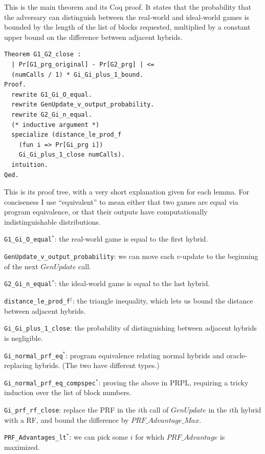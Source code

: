 \documentclass[12pt,lot, lof]{puthesis}
\newcommand{\li} {\lstinline}
\begin{document}
{This is the main theorem and its Coq proof. It states that the probability that the adversary can distinguish between the real-world and ideal-world games is bounded by the length of the list of blocks requested, multiplied by a constant upper bound on the difference between adjacent hybrids.

\begin{lstlisting}
Theorem G1_G2_close :
  | Pr[G1_prg_original] - Pr[G2_prg] | <= 
  (numCalls / 1) * Gi_Gi_plus_1_bound.
Proof.
  rewrite G1_Gi_O_equal.
  rewrite GenUpdate_v_output_probability.
  rewrite G2_Gi_n_equal.
  (* inductive argument *)
  specialize (distance_le_prod_f 
  	(fun i => Pr[Gi_prg i]) 
	Gi_Gi_plus_1_close numCalls).
  intuition.
Qed.
\end{lstlisting}

This is its proof tree, with a very short explanation given for each lemma. For conciseness I use ``equivalent'' to mean either that two games are equal via program equivalence, or that their outputs have computationally indistinguishable distributions. 

\begin{longenum}
\item \li|G1_Gi_O_equal|$^*$: the real-world game is equal to the first hybrid.
\item \li|GenUpdate_v_output_probability|: we can move each $v$-update to the beginning of the next $GenUpdate$ call.
\item \li|G2_Gi_n_equal|$^*$: the ideal-world game is equal to the last hybrid.
\item \li|distance_le_prod_f|$^\dag$: the triangle inequality, which lets us bound the distance between adjacent hybrids.
\item \li|Gi_Gi_plus_1_close|: the probability of distinguishing between adjacent hybrids is negligible.
  \begin{longenum}
  \item \li|Gi_normal_prf_eq|$^*$: program equivalence relating normal hybrids and oracle-replacing hybrids. (The two have different types.)
    \begin{longenum}
    \item \li|Gi_normal_prf_eq_compspec|$^*$: proving the above in PRPL, requiring a tricky induction over the list of block numbers.
    \end{longenum}
  \item \li|Gi_prf_rf_close|: replace the PRF in the $i$th call of $GenUpdate$ in the $i$th hybrid with a RF, and bound the difference by $PRF\_Advantage\_Max$.
    \begin{longenum}
      \item \li|PRF_Advantages_lt|$^*$: we can pick some $i$ for which $PRF\_Advantage$ is maximized.
    \end{longenum}


\end{longenum}
\end{longenum}}
\end{document}

